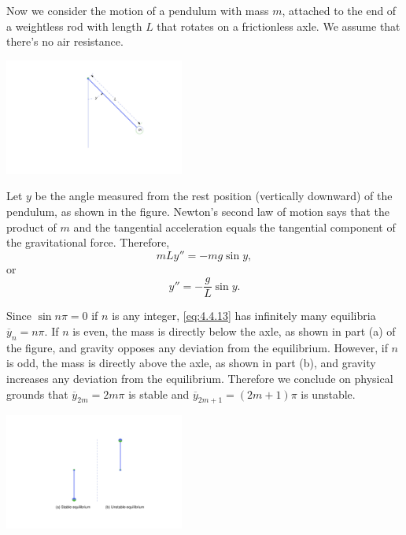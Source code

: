 \documentclass{ximera}
\begin{document}
 
 
\begin{example}\label{example:4.4.2}
Now we
consider the motion of a pendulum with mass $m$, attached to the end
of a weightless rod with length $L$ that rotates on a frictionless
axle. We assume that there's no air
resistance.
 
\begin{image}
 \includegraphics[height=1.5in]{fig040405.jpg}
\end{image}
 
 
Let $y$ be the angle measured from the rest position
(vertically downward) of the pendulum, as shown in
the figure. Newton's second law of motion says that the
product of $m$ and the tangential acceleration equals the tangential
component of the gravitational force.  Therefore,
$$
mLy''=-mg\sin y,
$$
or
\begin{equation} \label{eq:4.4.13}
y''=-\frac{g}{L} \sin y.
\end{equation}
 
 
Since $\sin n\pi=0$ if $n$ is any integer,  \eqref{eq:4.4.13} has
infinitely many equilibria $\overline{y}_n=n\pi$. If $n$ is
even, the mass is directly below the axle, as shown in part (a) of the figure, and gravity opposes any deviation
from the equilibrium. However, if $n$ is odd, the mass is directly
above the axle, as shown in part (b), and gravity
increases any deviation from the equilibrium. Therefore we conclude
on physical grounds that $\overline{y}_{2m}=2m\pi$ is stable and
$\overline{y}_{2m+1}=(2m+1)\pi$ is unstable.
 
 
\begin{image}
 \includegraphics[height=1.5in]{fig040406.jpg}
\end{image}
 

\end{example}
\end{document}
